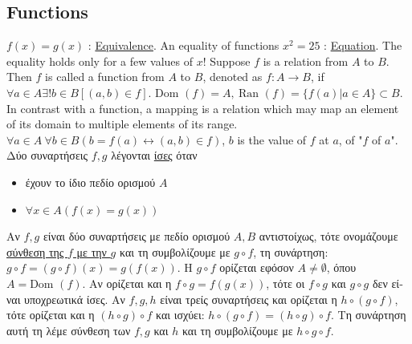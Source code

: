 \documentclass[12pt]{article}
\def\Dom{\text{Dom\ }} %
\def\Ran{\text{Ran\ }} %
\begin{document}
\begin{flushleft}
 	\pagebreak
	
	
	\section{Functions}

	\textbullet \quad $f(x) = g(x)$  :  \uline{Equivalence}. An equality of functions \linebreak 
	\textbullet \quad $x^2 = 25$  :  \uline{Equation}. The equality holds only for a few values of $x$! \linebreak 		
	\textbullet \quad Suppose $f$ is a relation from $A$ to $B$. Then $f$ is called a function from $A$ to $B$, denoted as $\displaystyle f: A\rightarrow B$, if $\forall a \in A \exists ! b \in B \left[(a,b) \in f \right]$. $\Dom(f) = A, \ \Ran(f) = \{f(a) | a\in A\} \subset B$. \linebreak 
	\textbullet \quad In contrast with a function, a mapping is a relation which may map an element of its domain to multiple elements of its range. \linebreak 
	\textbullet \quad $\displaystyle \forall a \in A \ \forall b\in B (b = f(a) \leftrightarrow (a,b) \in f) $, $b$ is the value of $f$ at $a$, of "$f$ of $a$".\linebreak
	\textbullet \quad \textgreek{Δύο συναρτήσεις} $f,g$ \textgreek{λέγονται} \uline{\textgreek{ίσες}} \textgreek{όταν}  
	\begin{itemize}
		\renewcommand{\labelitemi}{$\rightarrow$}
	\item \textgreek{έχουν το ίδιο πεδίο ορισμού} $A$
	\item $\forall x \in A (f(x) = g(x))$  
	\end{itemize}
	\textbullet \quad \textgreek{Αν $f, g$ είναι δύο συναρτήσεις με πεδίο ορισμού} $A, B$ \textgreek{αντιστοίχως, τότε ονομάζουμε \uline{σύνθεση της $f$ με την $g$} και τη συμβολίζουμε με} $g\circ f$, \textgreek{τη συνάρτηση}: $\displaystyle g \circ f = (g \circ f)(x) = g(f(x))$. \linebreak 
	\textgreek{Η} $g\circ f$ \textgreek{ορίζεται εφόσον} $A \neq \emptyset$, \textgreek{όπου} $A = \Dom(f)$. \textgreek{Αν ορίζεται και η} $f\circ g = f(g(x))$, \textgreek{τότε οι} $f\circ g$ \textgreek{και} $g\circ g$ \textgreek{δεν είναι υποχρεωτικά ίσες}. \linebreak 
	\textbullet \quad \textgreek{Αν} $f,g,h$ \textgreek{είναι τρείς συναρτήσεις και ορίζεται η} $h \circ (g\circ f)$, \textgreek{τότε ορίζεται και η} $(h\circ g) \circ f$ \textgreek{και ισχύει}: $\displaystyle h\circ (g\circ f) = (h\circ g) \circ f$. \textgreek{Τη συνάρτηση αυτή τη λέμε σύνθεση των} $f, g$ \textgreek{και} $h$ \textgreek{και τη συμβολίζουμε με} $\displaystyle h\circ g \circ f$. \linebreak 

\end{flushleft}
\end{document}
